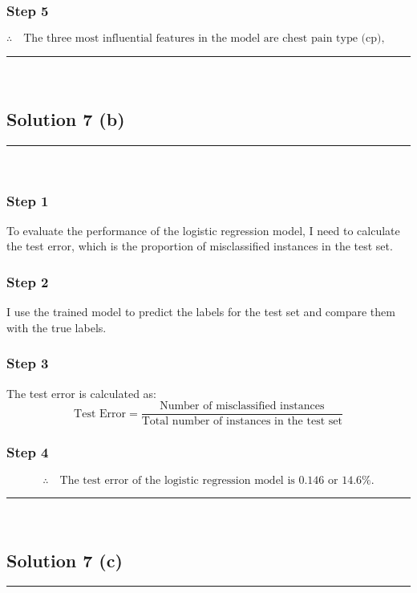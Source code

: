\documentclass{article}
\begin{document}
\subsubsection*{Step 5}
\parbox{\textwidth}{
\[
\therefore \quad \text{The three most influential features in the model are chest pain type (cp), thalassemia (thal), and number of major vessels (ca).}
\]
}

\noindent\rule{\textwidth}{0.4pt}\\

\newpage

\subsection*{Solution 7 (b)}
\noindent\rule{\textwidth}{0.4pt}\\

\subsubsection*{Step 1}
\parbox{\textwidth}{
To evaluate the performance of the logistic regression model, I need to calculate the test error, which is the proportion of misclassified instances in the test set.
}

\subsubsection*{Step 2}
\parbox{\textwidth}{
I use the trained model to predict the labels for the test set and compare them with the true labels.
}

\subsubsection*{Step 3}
\parbox{\textwidth}{
The test error is calculated as:
\[
\text{Test Error} = \frac{\text{Number of misclassified instances}}{\text{Total number of instances in the test set}}
\]
}

\subsubsection*{Step 4}
\parbox{\textwidth}{
\[
\therefore \quad \text{The test error of the logistic regression model is } 0.146 \text{ or } 14.6\%.
\]
}

\noindent\rule{\textwidth}{0.4pt}\\

\newpage

\subsection*{Solution 7 (c)}
\noindent\rule{\textwidth}{0.4pt}\\
\end{document}
